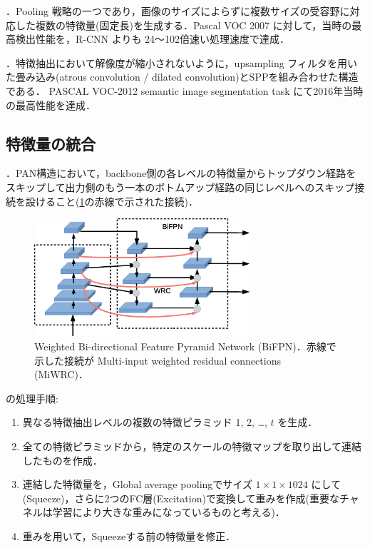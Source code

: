 \documentclass[originalpaper,fleqn]{jsaiart}     %
\begin{document}
\cite{HZRS15,HZRS14}．Pooling 戦略の一つであり，画像のサイズによらずに複数サイズの受容野に対応した複数の特徴量(固定長)を生成する．Pascal VOC 2007 に対して，当時の最高検出性能を，R-CNN よりも 24〜102倍速い処理速度で達成．

\cite{CPKMY17}．特徴抽出において解像度が縮小されないように，upsampling フィルタを用いた畳み込み(atrous convolution / dilated convolution)とSPPを組み合わせた構造である．
PASCAL VOC-2012 semantic image segmentation task にて2016年当時の最高性能を達成．

\subsection{特徴量の統合}
 \cite{TPL20}．PAN構造において，backbone側の各レベルの特徴量からトップダウン経路をスキップして出力側のもう一本のボトムアップ経路の同じレベルへのスキップ接続を設けること(\ref{fig:archi_wrc}の赤線で示された接続)．
\begin{figure}[tb]
    \begin{center}
        \includegraphics[width=8cm,clip]{fig/archi_BiFPN,WRC.eps}
    \end{center}
    \caption{ Weighted Bi-directional Feature Pyramid Network (BiFPN)．赤線で示した接続が Multi-input weighted residual connections (MiWRC)．}
    \label{fig:archi_wrc}
\end{figure}

 \cite{ZSWTCCL19} の処理手順:
\begin{enumerate}
    \item 異なる特徴抽出レベルの複数の特徴ピラミッド 1, 2, …, $t$ を生成．
    \item 全ての特徴ピラミッドから，特定のスケールの特徴マップを取り出して連結したものを作成．
    \item 連結した特徴量を，Global average poolingでサイズ $1{\times}1{\times}1024$ にして(Squeeze)，さらに2つのFC層(Excitation)で変換して重みを作成(重要なチャネルは学習により大きな重みになっているものと考える)．
    \item 重みを用いて，Squeezeする前の特徴量を修正．
\end{enumerate}
\end{document}
